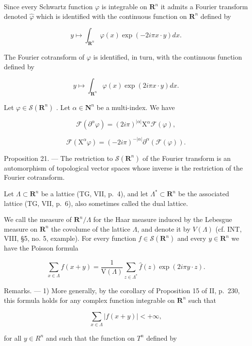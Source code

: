 Since every Schwartz function \(\varphi\) is integrable on \(\mathbf{R}^n\) it admits a Fourier transform denoted \(\widehat{\varphi}\) which is identified with the continuous function on \(\mathbf{R}^n\) defined by

\[
y \mapsto \int_ {\mathbf {R} ^ {n}} \varphi (x) \exp (- 2 i \pi x \cdot y) d x.
\]

The Fourier cotransform of \(\varphi\) is identified, in turn, with the continuous function defined by

\[
y \mapsto \int_ {\mathbf {R} ^ {n}} \varphi (x) \exp (2 i \pi x \cdot y) d x.
\]

Let \(\varphi\in\mathcal{S}(\mathbf{R}^{n})\) . Let \(\alpha\in\mathbf{N}^{n}\) be a multi-index. We have

\[
\mathcal {F} (\partial^ {\alpha} \varphi) = (2 i \pi) ^ {| \alpha |} \mathrm{X} ^ {\alpha} \mathcal {F} (\varphi),
\]

\[
\mathcal {F} (\mathrm{X} ^ {\alpha} \varphi) = (- 2 i \pi) ^ {- | \alpha |} \partial^ {\alpha} (\mathcal {F} (\varphi)).
\]

Proposition 21. — The restriction to \(\mathcal{S}(\mathbf{R}^{n})\) of the Fourier transform is an automorphism of topological vector spaces whose inverse is the restriction of the Fourier cotransform.

Let \(\Lambda \subset \mathbf{R}^n\) be a lattice (TG, VII, p.~4), and let \(\Lambda^{*} \subset \mathbf{R}^{n}\) be the associated lattice (TG, VII, p.~6), also sometimes called the dual lattice.

We call the measure of \(\mathbf{R}^n/\Lambda\) for the Haar measure induced by the Lebesgue measure on \(\mathbf{R}^n\) the covolume of the lattice \(\Lambda\), and denote it by \(V(\Lambda)\) (cf. INT, VIII, §5, no. 5, example). For every function \(f \in \mathcal{S}(\mathbf{R}^n)\) and every \(y \in \mathbf{R}^n\) we have the Poisson formula

\[
\sum_ {x \in \Lambda} f (x + y) = \frac {1}{\mathrm{V} (\Lambda)} \sum_ {z \in \Lambda^ {*}} \widehat {f} (z) \exp (2 i \pi y \cdot z).
\]

Remarks. --- 1) More generally, by the corollary of Proposition 15 of II, p.~230, this formula holds for any complex function integrable on \(\mathbf{R}^n\) such that

\[
\sum_ {x \in \Lambda} | f (x + y) | <   + \infty ,
\]

for all \(y \in R^{n}\) and such that the function on \(T^{n}\) defined by

